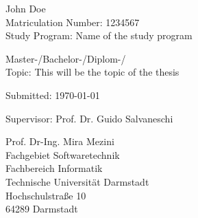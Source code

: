 \begin{tabular}{c}\end{tabular}
\vfill
John Doe\\
Matriculation Number: 1234567\\
Study Program: Name of the study program
 
Master-/Bachelor-/Diplom-/\\
Topic: This will be the topic of the thesis

Submitted: \today

Supervisor: Prof. Dr. Guido Salvaneschi

Prof. Dr-Ing. Mira Mezini\\
Fachgebiet Softwaretechnik\\
Fachbereich Informatik\\
Technische Universität Darmstadt\\
Hochschulstraße 10\\
64289 Darmstadt